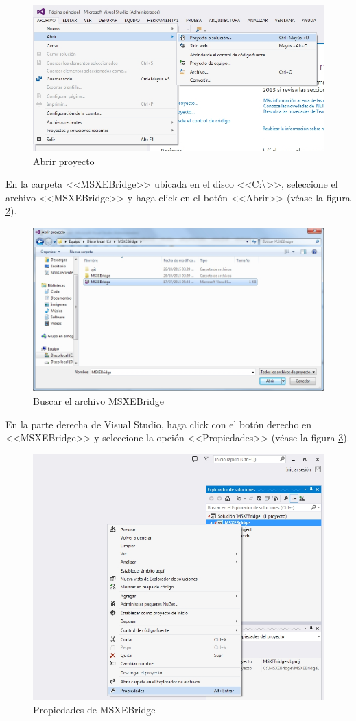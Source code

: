 \begin{figure}[H]
  \centering
  \includegraphics[width=.8\linewidth]{./img/vs-proyecto-abrir.jpg}
\caption[]{Abrir proyecto\label{fig:vs-abrir}}
\end{figure}

\newpage

En la carpeta <<MSXEBridge>> ubicada en el disco <<C:\textbackslash>>, seleccione el archivo <<MSXEBridge>> y haga click en el bot\'{o}n <<Abrir>> (v\'{e}ase la figura \ref{fig:vs-abrir-buscar}).

\begin{figure}[H]
  \centering
  \includegraphics[width=.8\linewidth]{./img/vs-abrir-buscar.jpg}
\caption[]{Buscar el archivo MSXEBridge\label{fig:vs-abrir-buscar}}
\end{figure}

En la parte derecha de Visual Studio, haga click con el bot\'{o}n derecho en <<MSXEBridge>> y seleccione la opci\'{o}n <<Propiedades>> (v\'{e}ase la figura \ref{fig:vs-propiedades}).

\begin{figure}[H]
  \centering
  \includegraphics[width=.7\linewidth]{./img/vs-propiedades.jpg}
\caption[]{Propiedades de MSXEBridge\label{fig:vs-propiedades}}
\end{figure}


